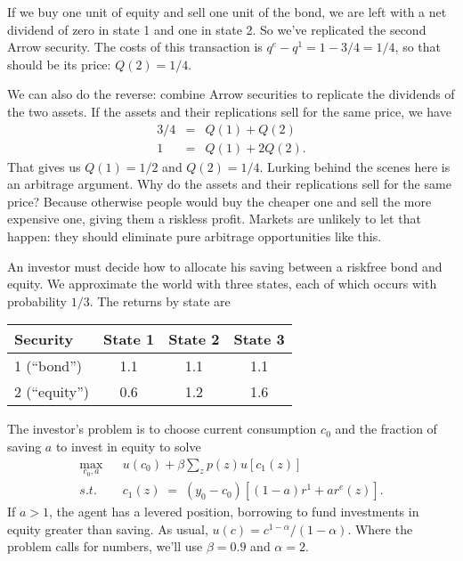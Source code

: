 \documentclass[11pt]{exam}
\begin{document}
\begin{questions}
\begin{solution}
\begin{parts}
\item If we buy one unit of equity and sell one unit of the bond,
we are left with a net dividend of zero in state 1 and one in state 2.
So we've replicated the second Arrow security.
The costs of this transaction is $ q^e - q^1 = 1 - 3/4 = 1/4 $,
so that should be its price:  $Q(2) = 1/4$.

\item We can also do the reverse:  combine Arrow securities to replicate
the dividends of the two assets.
If the assets and their replications sell for the same price,
we have
\begin{eqnarray*}
    3/4 &=&  Q(1) + Q(2) \\
     1   &=& Q(1) + 2 Q(2) .
\end{eqnarray*}
That gives us $Q(1) = 1/2$ and $Q(2) = 1/4$.
Lurking behind the scenes here is an arbitrage argument.
Why do the assets and their replications sell for the same price?
Because otherwise people would buy the cheaper one and sell the more expensive one,
giving them a riskless profit.
Markets are unlikely to let that happen:  they should eliminate pure arbitrage opportunities like this.

\end{parts}
\end{solution}


An investor must decide how to allocate his saving
between a riskfree bond and equity.
We approximate the world with three states,
each of which occurs with probability $1/3$.
The returns by state are

\begin{center}
\begin{tabular}{lccc}
\toprule
Security  &  State 1 & State 2 & State 3\\
\midrule
1 (``bond'')    &  1.1    &   1.1  &  1.1 \\
2 (``equity'')  &  0.6    &   1.2  &  1.6 \\
\bottomrule
\end{tabular}
\end{center}


The investor's problem is to choose current consumption $c_0$
and the fraction of saving $a$ to invest in equity to solve
\begin{eqnarray*}
   \max_{c_0, a} &&  u(c_0) + \beta \sum_z p(z) u[c_1(z)] \\
        s.t. &&  c_1(z)\;=\; (y_0-c_0)[(1-a) r^1 + a r^e(z)] .
\end{eqnarray*}
If $a>1$, the agent has a levered position, borrowing to fund investments in equity greater
than saving.
As usual, $u(c) = c^{1-\alpha}/(1-\alpha)$.
Where the problem calls for numbers, we'll use $\beta = 0.9$ and $\alpha = 2$.


\end{questions}
\end{document}
